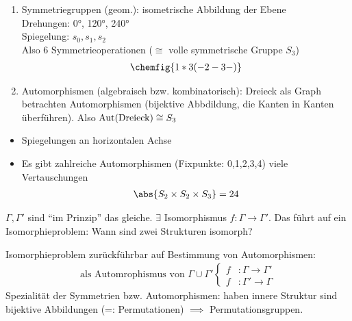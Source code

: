 \begin{example}
	\begin{enumerate} %
		\item Symmetriegruppen (geom.):	isometrische Abbildung der Ebene\\
		Drehungen: 0°, 120°, 240°\\
		Spiegelung: $s_0,s_1,s_2$\\
		Also 6 Symmetrieoperationen ($\cong$ volle symmetrische Gruppe $S_3$)
		\begin{align*}
			\chemfig{1*3(-2-3-)}
		\end{align*}
		\item Automorphismen (algebraisch bzw. kombinatorisch): Dreieck als Graph betrachten Automorphismen (bijektive Abbdildung, die Kanten in Kanten überführen). Also $\operatorname{Aut}(\text{Dreieck}) \cong S_3$
	\end{enumerate} %
	\begin{itemize}
		\item Spiegelungen an horizontalen Achse
		\item Es gibt zahlreiche Automorphismen (Fixpunkte: 0,1,2,3,4) viele Vertauschungen
		\begin{align*}
			\abs{S_2 \times S_2 \times S_3} = 24
		\end{align*}
	\end{itemize}
	$\Gamma,\Gamma'$ sind ``im Prinzip'' das gleiche. $\exists$ Isomorphismus $f\colon \Gamma \to \Gamma'$. Das führt auf ein Isomorphieproblem: Wann sind zwei Strukturen isomorph?
\end{example}
\begin{remark}
	Isomorphieproblem zurückführbar auf Bestimmung von Automorphismen:
	\begin{align*}
		\text{als Automrophismus von $\Gamma \cup \Gamma'$}\begin{cases}
			f&\colon \Gamma \to \Gamma'\\
			f&\colon \Gamma' \to \Gamma 
		\end{cases}
	\end{align*}
	Spezialität der Symmetrien bzw. Automorphismen: haben innere Struktur sind bijektive Abbildungen (=: Permutationen) $\implies$ Permutationsgruppen.
\end{remark}
